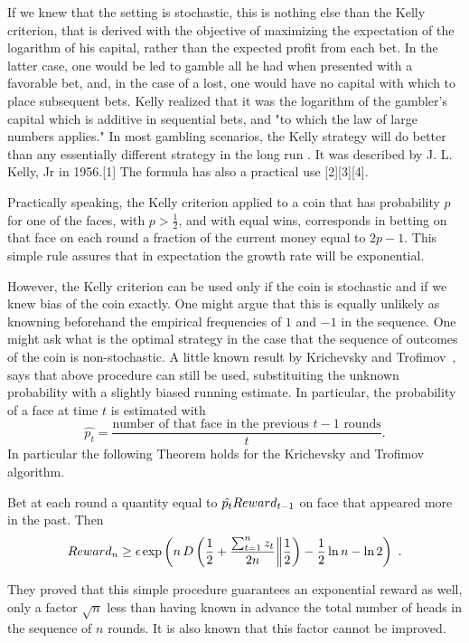 If we knew that the setting is stochastic, this is nothing else than the Kelly criterion, that is derived with the objective of maximizing the expectation of the logarithm of his capital, rather than the expected profit from each bet.
In the latter case, one would be led to gamble all he had when presented with a favorable bet, and, in the case of a lost, one would have no capital with which to place subsequent bets. Kelly realized that it was the logarithm of the gambler's capital which is additive in sequential bets, and "to which the law of large numbers applies."
In most gambling scenarios, the Kelly strategy will do better than any essentially different strategy in the long run \cite{}. It was described by J. L. Kelly, Jr in 1956.[1] The formula has also a practical use [2][3][4].

Practically speaking, the Kelly criterion applied to a coin that has probability $p$ for one of the faces, with $p> \frac{1}{2}$, and with equal wins, corresponds in betting on that face on each round a fraction of the current money equal to $2p-1$. This simple rule assures that in expectation the growth rate will be exponential.

However, the Kelly criterion can be used only if the coin is stochastic and if we knew bias of the coin exactly. One might argue that this is equally unlikely as knowning beforehand the empirical frequencies of $1$ and $-1$ in the sequence.
One might ask what is the optimal strategy in the case that the sequence of outcomes of the coin is non-stochastic.
A little known result by Krichevsky and Trofimov~\cite{}, says that above procedure can still be used, substituiting the  unknown probability with a slightly biased running estimate. In particular, the probability of a face at time $t$ is estimated with 
\[
\hat{p_t}=\frac{\text{number of that face in the previous } t-1 \text{ rounds}}{t}.
\]
In particular the following Theorem holds for the Krichevsky and Trofimov algorithm.
\begin{theorem}
Bet at each round a quantity equal to $\hat{p_t} Reward_{t-1}$ on face that appeared more in the past. Then
\begin{align*}
Reward_{n} 
\geq \epsilon \exp\left(n\, D\left(\frac{1}{2}+\frac{\sum_{t=1}^n z_t}{2 n}\middle\|\frac{1}{2}\right) - \frac{1}{2} \ln n - \ln 2\right)~.
\end{align*}
\end{theorem}

They proved that this simple procedure guarantees an exponential reward as well, only a factor $\sqrt{n}$ less than having known in advance the total number of heads in the sequence of $n$ rounds. It is also known that this factor cannot be improved.

